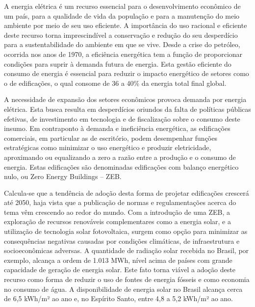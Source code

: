 \begin{onehalfspace}
    \footnotesize
    \noindent A energia elétrica é um recurso essencial para o desenvolvimento econômico de 
    um país, para a qualidade de vida da população e para a manutenção do meio ambiente
    por meio de seu uso eficiente. A importância do uso racional e eficiente deste
    recurso torna imprescindível a conservação e redução do seu desperdício para a 
    sustentabilidade do ambiente em que se vive. Desde a crise do petróleo, ocorrida nos
    anos de 1970, a eficiência energética tem a função de proporcionar condições para suprir à
    demanda futura de energia. Esta gestão eficiente do consumo de energia é essencial para 
    reduzir o impacto energético de setores como o de edificações, o qual consome de 36 a 40\% 
    da energia total final global.\newline

    \noindent A necessidade de expansão dos setores econômicos provoca demanda
    por energia elétrica. Esta busca resulta em desperdícios oriundos da falta de políticas 
    públicas efetivas, de investimento em tecnologia e de fiscalização sobre o consumo deste 
    insumo. Em contraponto à demanda e ineficiência energética, as edificações comerciais, em 
    particular as de escritório, podem desempenhar funções estratégicas como minimizar o uso 
    energético e produzir eletricidade, aproximando ou equalizando a zero a razão entre a 
    produção e o consumo de energia. Estas edificações são denominadas edificações com balanço 
    energético nulo, ou Zero Energy Buildings – ZEB.\newline
    
    Calcula-se que a tendência de adoção desta
    forma de projetar edificações crescerá até 2050, haja vista que a publicação de normas e
    regulamentações acerca do tema vêm crescendo ao redor do mundo. Com a introdução de uma ZEB,
    a exploração de recursos renováveis complementares como a energia solar, e a utilização 
    de tecnologia solar fotovoltaica, surgem como opção para minimizar as consequências 
    negativas causadas por condições climáticas, de infraestrutura e socioeconômicas adversas.
    A quantidade de radiação solar recebida no Brasil, por exemplo, alcança a ordem de 
    1.013 MWh, nível acima de países com grande capacidade de geração de energia solar. 
    Este fato torna viável a adoção deste recurso como forma de reduzir o uso de fontes de 
    energia fósseis e como economia no consumo de água. A disponibilidade de energia solar 
    no Brasil alcança cerca de 6,5 kWh/m² ao ano e, no Espírito Santo, entre 4,8 a
    5,2 kWh/m² ao ano.
\end{onehalfspace}

